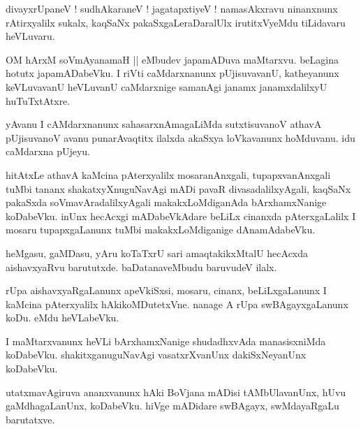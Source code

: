 \documentclass{article}
\begin{document}
\begin{mng}%
divayxrUpaneV ! sudhAkaraneV ! jagatapxtiyeV ! namasAkxravu ninanxnunx rAtirxyalilx sukalx, 
kaqSaNx pakaSxgaLeraDaralUlx irutitxVyeMdu tiLidavaru heVLuvaru.
\end{mng}

\begin{mng}%
OM hArxM soVmAyanamaH || eMbudev japamADuva maMtarxvu. beLagina hotutx japamADabeVku. I riVti 
caMdarxnanunx pUjisuvavanU, katheyanunx keVLuvavanU heVLuvanU caMdarxnige samanAgi janamx 
janamxdalilxyU huTuTxtAtxre.
\end{mng}

\begin{mng}%
yAvanu I cAMdarxnanunx sahasarxnAmagaLiMda sutxtisuvanoV athavA pUjisuvanoV avanu punarAvaqtitx 
ilalxda akaSxya loVkavanunx hoMduvanu. idu caMdarxna pUjeyu.
\end{mng}

\begin{mng}%
hitAtxLe athavA kaMcina pAterxyalilx mosaranAnxgali, tupapxvanAnxgali tuMbi tananx 
shakatxyXnuguNavAgi mADi pavaR divasadalilxyAgali, kaqSaNx pakaSxda soVmavAradalilxyAgali 
makakxLoMdiganAda bArxhamxNanige koDabeVku. inUnx hecAcxgi mADabeVkAdare beLiLx cinanxda 
pAterxgaLalilx I mosaru tupapxgaLanunx tuMbi makakxLoMdiganige dAnamAdabeVku.
\end{mng}

\begin{mng}%
heMgasu, gaMDasu, yAru  koTaTxrU sari amaqtakikxMtalU hecAcxda aishavxyaRvu barututxde. 
baDatanaveMbudu baruvudeV ilalx.
\end{mng}

\begin{mng}%
rUpa aishavxyaRgaLanunx apeVkiSxsi, mosaru, cinanx, beLiLxgaLanunx I kaMcina pAterxyalilx 
hAkikoMDutetxVne. nanage A rUpa swBAgayxgaLanunx koDu. eMdu heVLabeVku.
\end{mng}

\begin{mng}%
I maMtarxvanunx heVLi bArxhamxNanige shudadhxvAda manasisxniMda koDabeVku. shakitxganuguNavAgi 
vasatxrXvanUnx dakiSxNeyanUnx koDabeVku.
\end{mng}

\begin{mng}%
utatxmavAgiruva ananxvanunx hAki BoVjana mADisi tAMbUlavanUnx, hUvu gaMdhagaLanUnx, koDabeVku. 
hiVge mADidare swBAgayx, swMdayaRgaLu barutatxve.
\end{mng}
\end{document}
